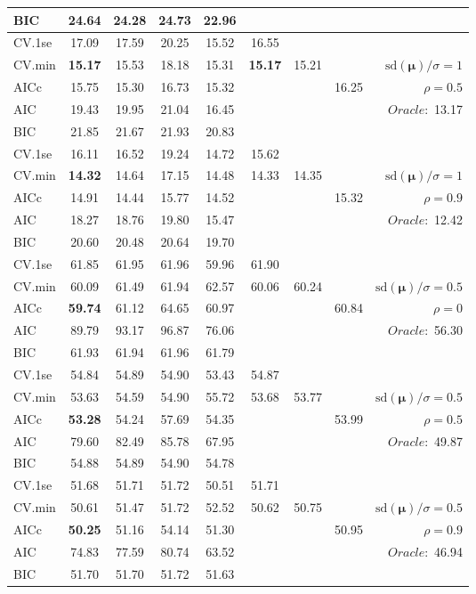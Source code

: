 \begin{table}
\begin{center}
\begin{tabular}{l*{7}{c}|r}
BIC & 24.64 & 24.28 & 24.73 & 22.96 & & & &  \\
 \hline 
CV.1se & 17.09 & 17.59 & 20.25 & 15.52 & 16.55 & & & \\
CV.min & {\bf 15.17} & 15.53 & 18.18 & 15.31 & {\bf 15.17} & 15.21 & & $\mathrm{sd}(\mathbf{\mu})/\sigma=1$ \\
AICc & 15.75 & 15.30 & 16.73 & 15.32 & & & 16.25 &  $\rho=0.5$ \\
AIC & 19.43 & 19.95 & 21.04 & 16.45 & & & &  \multirow{2}{*}{$Oracle: $ 13.17} \\
BIC & 21.85 & 21.67 & 21.93 & 20.83 & & & &  \\
 \hline 
CV.1se & 16.11 & 16.52 & 19.24 & 14.72 & 15.62 & & & \\
CV.min & {\bf 14.32} & 14.64 & 17.15 & 14.48 & 14.33 & 14.35 & & $\mathrm{sd}(\mathbf{\mu})/\sigma=1$ \\
AICc & 14.91 & 14.44 & 15.77 & 14.52 & & & 15.32 &  $\rho=0.9$ \\
AIC & 18.27 & 18.76 & 19.80 & 15.47 & & & &  \multirow{2}{*}{$Oracle: $ 12.42} \\
BIC & 20.60 & 20.48 & 20.64 & 19.70 & & & &  \\
 \hline 
CV.1se & 61.85 & 61.95 & 61.96 & 59.96 & 61.90 & & & \\
CV.min & 60.09 & 61.49 & 61.94 & 62.57 & 60.06 & 60.24 & & $\mathrm{sd}(\mathbf{\mu})/\sigma=0.5$ \\
AICc & {\bf 59.74} & 61.12 & 64.65 & 60.97 & & & 60.84 &  $\rho=0$ \\
AIC & 89.79 & 93.17 & 96.87 & 76.06 & & & &  \multirow{2}{*}{$Oracle: $ 56.30} \\
BIC & 61.93 & 61.94 & 61.96 & 61.79 & & & &  \\
 \hline 
CV.1se & 54.84 & 54.89 & 54.90 & 53.43 & 54.87 & & & \\
CV.min & 53.63 & 54.59 & 54.90 & 55.72 & 53.68 & 53.77 & & $\mathrm{sd}(\mathbf{\mu})/\sigma=0.5$ \\
AICc & {\bf 53.28} & 54.24 & 57.69 & 54.35 & & & 53.99 &  $\rho=0.5$ \\
AIC & 79.60 & 82.49 & 85.78 & 67.95 & & & &  \multirow{2}{*}{$Oracle: $ 49.87} \\
BIC & 54.88 & 54.89 & 54.90 & 54.78 & & & &  \\
 \hline 
CV.1se & 51.68 & 51.71 & 51.72 & 50.51 & 51.71 & & & \\
CV.min & 50.61 & 51.47 & 51.72 & 52.52 & 50.62 & 50.75 & & $\mathrm{sd}(\mathbf{\mu})/\sigma=0.5$ \\
AICc & {\bf 50.25} & 51.16 & 54.14 & 51.30 & & & 50.95 &  $\rho=0.9$ \\
AIC & 74.83 & 77.59 & 80.74 & 63.52 & & & &  \multirow{2}{*}{$Oracle: $ 46.94} \\
BIC & 51.70 & 51.70 & 51.72 & 51.63 & & & &  \\
 \hline 
\end{tabular}
\end{center}
\vspace{-1cm}
\end{table}





